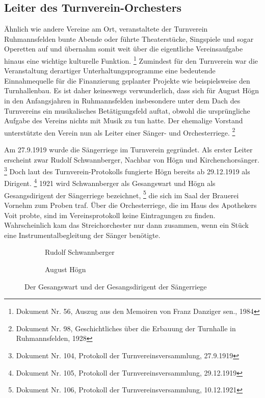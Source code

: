 \subsection{Leiter des Turnverein-Orchesters}

Ähnlich wie andere Vereine am Ort, veranstaltete der Turnverein
Ruhmannsfelden bunte Abende oder führte Theaterstücke, Singspiele und
sogar Operetten auf und übernahm somit weit über die eigentliche
Vereinsaufgabe hinaus eine wichtige kulturelle Funktion.
\footnote{Dokument Nr. 56, Auszug aus den Memoiren von Franz Danziger
sen., 1984} Zumindest für den Turnverein war die Veranstaltung
derartiger Unterhaltungsprogramme eine bedeutende Einnahmequelle für die
Finanzierung geplanter Projekte wie beispielsweise den Turnhallenbau. Es
ist daher keineswegs verwunderlich, dass sich für August Högn in den
Anfangsjahren in Ruhmannsfelden insbesondere unter dem Dach des
Turnvereins ein musikalisches Betätigungsfeld auftat, obwohl die
ursprüngliche Aufgabe des Vereins nichts mit Musik zu tun hatte. Der
ehemalige Vorstand unterstützte den Verein nun als Leiter einer Sänger-
und Orchesterriege. \footnote{Dokument Nr. 98, Geschichtliches über die
Erbauung der Turnhalle in Ruhmannsfelden, 1928}

Am 27.9.1919 wurde die Sängerriege im Turnverein gegründet. Als erster
Leiter erscheint zwar Rudolf Schwannberger, Nachbar von Högn und
Kirchenchorsänger. \footnote{Dokument Nr. 104, Protokoll der
Turnvereinsversammlung, 27.9.1919} Doch laut des Turnverein-Protokolls
fungierte Högn bereits ab 29.12.1919 als Dirigent. \footnote{Dokument
Nr. 105, Protokoll der Turnvereinsversammlung, 29.12.1919} 1921 wird
Schwannberger als Gesangswart und Högn als Gesangsdirigent der
Sängerriege bezeichnet, \footnote{Dokument Nr. 106, Protokoll der
Turnvereinsversammlung, 10.12.1921} die sich im Saal der Brauerei
Vornehm zum Proben traf. Über die Orchesterriege, die im Haus des
Apothekers Voit probte, sind im Vereinsprotokoll keine Eintragungen zu
finden. Wahrscheinlich kam das Streichorchester nur dann zusammen, wenn
ein Stück eine Instrumentalbegleitung der Sänger benötigte.

\begin{figure}
%
\begin{subfigure}[t]{0.5\linewidth}
\centering
{}
\caption{Rudolf Schwannberger}
\end{subfigure}
%
\begin{subfigure}[t]{0.5\linewidth}
\centering
{}
\caption{August Högn}
\end{subfigure}
%
\caption{Der Gesangswart und der Gesangsdirigent der Sängerriege}
\end{figure}

